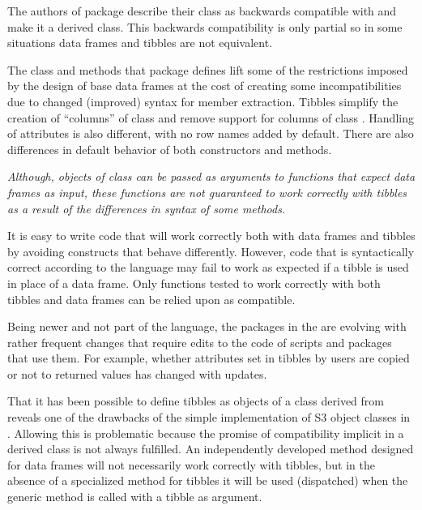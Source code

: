 \documentclass[krantz2]{krantz}\usepackage{knitr}
\begin{document}
The authors of package  describe their  class as backwards compatible with  and make it a derived class. This backwards compatibility is only partial so in some situations data frames and tibbles are not equivalent.

The class and methods that package  defines lift some of the restrictions imposed by the design of base \Rlang data frames at the cost of creating some incompatibilities due to changed (improved) syntax for member extraction. Tibbles simplify the creation of ``columns'' of class  and remove support for columns of class . Handling of attributes is also different, with no row names added by default. There are also differences in default behavior of both constructors and methods.

\emph{Although, objects of class  can be passed as arguments to functions that expect data frames as input, these functions are not guaranteed to work correctly with tibbles as a result of the differences in syntax of some methods.}

\begin{warningbox}
It is easy to write code that will work correctly both with data frames and tibbles by avoiding constructs that behave differently. However, code that is syntactically correct according to the \Rlang language may fail to work as expected if a tibble is used in place of a data frame. Only functions tested to work correctly with both tibbles and data frames can be relied upon as compatible.

Being newer and not part of the \Rlang language, the packages in the  are evolving with rather frequent changes that require edits to the code of scripts and packages that use them. For example, whether attributes set in tibbles by users are copied or not to returned values has changed with updates.
\end{warningbox}

\begin{explainbox}
That it has been possible to define tibbles as objects of a class derived from  reveals one of the drawbacks of the simple implementation of S3 object classes in \Rlang. Allowing this is problematic because the promise of compatibility implicit in a derived class is not always fulfilled. An independently developed method designed for data frames will not necessarily work correctly with tibbles, but in the absence of a specialized method for tibbles it will be used (dispatched) when the generic method is called with a tibble as argument.
\end{explainbox}
\end{document}
